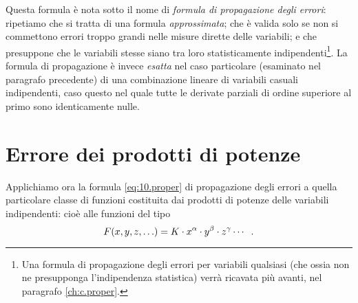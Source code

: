 Questa formula \`e nota sotto il nome di \emph{formula di
  propagazione degli errori}: ripetiamo che si tratta di una
formula \emph{approssimata}; che \`e valida solo se non si
commettono errori troppo grandi nelle misure dirette delle
variabili; e che presuppone che le variabili stesse siano
tra loro statisticamente indipendenti\/\footnote{Una formula
  di propagazione degli errori per variabili qualsiasi (che
  ossia non ne presupponga l'indipendenza statistica)
  verr\`a ricavata pi\`u avanti, nel paragrafo
  \ref{ch:c.proper}.}.  La formula di propagazione \`e
invece \emph{esatta} nel caso particolare (esaminato nel
paragrafo precedente) di una combinazione lineare di
variabili casuali indipendenti, caso questo nel quale tutte
le derivate parziali di ordine superiore al primo sono
identicamente nulle.%
%

\section{Errore dei prodotti di potenze}%
Applichiamo ora la formula \eqref{eq:10.proper} di
propagazione degli errori a quella particolare classe di
funzioni costituita dai prodotti di potenze delle variabili
indipendenti: cio\`e alle funzioni del tipo
\begin{equation*}
  F(x, y, z,\ldots) = K \cdot
  x^\alpha \cdot y^\beta \cdot z^\gamma\cdots \peq .
\end{equation*}

